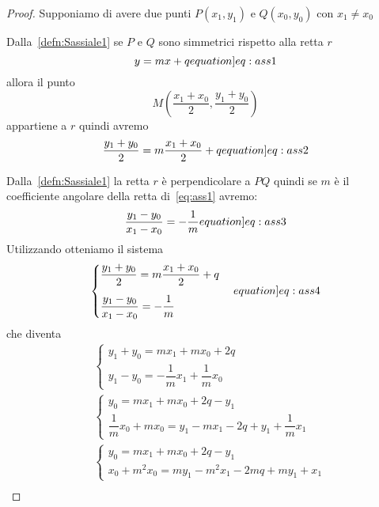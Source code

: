\begin{proof}
	Supponiamo di avere due punti $P(x_1,y_1)$ e $Q(x_0,y_0)$ con $x_1\neq x_0$
	
	 Dalla~\cref{defn:Sassiale1} se $P$ e $Q$ sono simmetrici rispetto alla retta $r$ 
	  \begin{equation}
	 y=mx+q\label[equation]{eq:ass1}
	 \end{equation}
	 allora il punto \[M\left(\frac{x_1+x_0}{2},\frac{y_1+y_0}{2}\right)\] appartiene a $r$ quindi avremo 
	 \begin{equation}
	 \dfrac{y_1+y_0}{2}=m\dfrac{x_1+x_0}{2}+q\label[equation]{eq:ass2}
	 \end{equation}
	 
	 Dalla~\cref{defn:Sassiale1} la retta $r$ è perpendicolare a $PQ$ quindi se $m$ è il coefficiente angolare della retta di~\cref{eq:ass1} avremo:\begin{equation}
	 \dfrac{y_1-y_0}{x_1-x_0}=-\dfrac{1}{m}\label[equation]{eq:ass3}
	 \end{equation}
	 Utilizzando  otteniamo il sistema
	 \begin{equation}
	 \begin{cases}
	 \dfrac{y_1+y_0}{2}=m\dfrac{x_1+x_0}{2}+q\\[0.4cm]
	 \dfrac{y_1-y_0}{x_1-x_0}=-\dfrac{1}{m}
	 \end{cases}\label[equation]{eq:ass4}
	 \end{equation}
	 che diventa
	  \begin{align*}
	 & \begin{cases}
	 y_1+y_0=mx_1+mx_0+2q\\
	 y_1-y_0=-\dfrac{1}{m}x_1+\dfrac{1}{m}x_0
	 \end{cases}\\
	 & \begin{cases}
	 y_0=mx_1+mx_0+2q-y_1\\
	 \dfrac{1}{m}x_0+mx_0= y_1-mx_1-2q+y_1+\dfrac{1}{m}x_1
	 \end{cases}\\
	 & \begin{cases}
	 y_0=mx_1+mx_0+2q-y_1\\
	 x_0+m^2x_0= my_1-m^2x_1-2mq+my_1+x_1
	 \end{cases}\\

\end{align*}
\end{proof}
